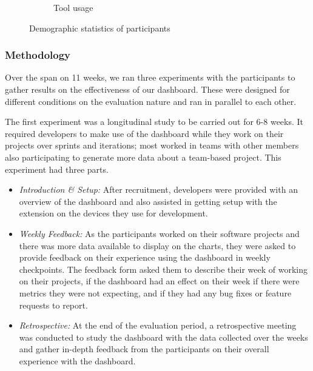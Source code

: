 \documentclass[../mpaper.tex]{subfiles}
\begin{document}
\begin{figure}
\begin{subfigure}{\linewidth}
{
     }
	\caption{Tool usage}
    \end{subfigure}
    \caption{Demographic statistics of participants}
    \label{fig:demographics}
\end{figure}

\subsubsection*{Methodology}

Over the span on 11 weeks, we ran three experiments with the participants to gather results on the effectiveness of our dashboard. These were designed for different conditions on the evaluation nature and ran in parallel to each other.

The first experiment was a longitudinal study to be carried out for 6-8 weeks. It required developers to make use of the dashboard while they work on their projects over sprints and iterations; most worked in teams with other members also participating to generate more data about a team-based project. This experiment had three parts.

\begin{itemize}
    \item \textit{Introduction \& Setup:} After recruitment, developers were provided with an overview of the dashboard and also assisted in getting setup with the extension on the devices they use for development.

    \item \textit{Weekly Feedback:} As the participants worked on their software projects and there was more data available to display on the charts, they were asked to provide feedback on their experience using the dashboard in weekly checkpoints. The feedback form asked them to describe their week of working on their projects, if the dashboard had an effect on their week if there were metrics they were not expecting, and if they had any bug fixes or feature requests to report.

    \item \textit{Retrospective:} At the end of the evaluation period, a retrospective meeting was conducted to study the dashboard with the data collected over the weeks and gather in-depth feedback from the participants on their overall experience with the dashboard.
\end{itemize}
\end{document}
